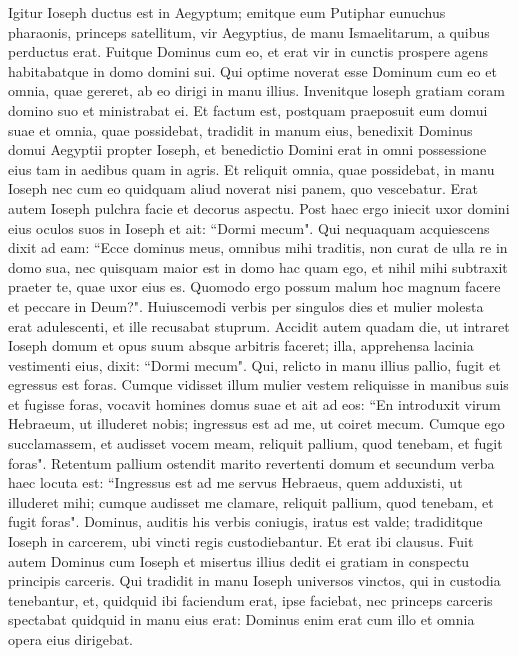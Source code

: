 \begin{biblechapter}  
\verse Igitur Ioseph ductus est in Aegyptum; emitque eum Putiphar eunuchus pharaonis, princeps satellitum, vir Aegyptius, de manu Ismaelitarum, a quibus perductus erat. 
\verse Fuitque Dominus cum eo, et erat vir in cunctis prospere agens habitabatque in domo domini sui. 
\verse Qui optime noverat esse Dominum cum eo et omnia, quae gereret, ab eo dirigi in manu illius. 
\verse Invenitque loseph gratiam coram domino suo et ministrabat ei. Et factum est, postquam praeposuit eum domui suae et omnia, quae possidebat, tradidit in manum eius, 
\verse benedixit Dominus domui Aegyptii propter Ioseph, et benedictio Domini erat in omni possessione eius tam in aedibus quam in agris. 
\verse Et reliquit omnia, quae possidebat, in manu Ioseph nec cum eo quidquam aliud noverat nisi panem, quo vescebatur. Erat autem Ioseph pulchra facie et decorus aspectu. 
\verse Post haec ergo iniecit uxor domini eius oculos suos in Ioseph et ait: “Dormi mecum". 
\verse Qui nequaquam acquiescens dixit ad eam: “Ecce dominus meus, omnibus mihi traditis, non curat de ulla re in domo sua, 
\verse nec quisquam maior est in domo hac quam ego, et nihil mihi subtraxit praeter te, quae uxor eius es. Quomodo ergo possum malum hoc magnum facere et peccare in Deum?".  
\verse Huiuscemodi verbis per singulos dies et mulier molesta erat adulescenti, et ille recusabat stuprum. 
\verse Accidit autem quadam die, ut intraret Ioseph domum et opus suum absque arbitris faceret; 
\verse illa, apprehensa lacinia vestimenti eius, dixit: “Dormi mecum". Qui, relicto in manu illius pallio, fugit et egressus est foras.  
\verse Cumque vidisset illum mulier vestem reliquisse in manibus suis et fugisse foras, 
\verse vocavit homines domus suae et ait ad eos: “En introduxit virum Hebraeum, ut illuderet nobis; ingressus est ad me, ut coiret mecum. Cumque ego succlamassem, 
\verse et audisset vocem meam, reliquit pallium, quod tenebam, et fugit foras". 
\verse Retentum pallium ostendit marito revertenti domum 
\verse et secundum verba haec locuta est: “Ingressus est ad me servus Hebraeus, quem adduxisti, ut illuderet mihi; 
\verse cumque audisset me clamare, reliquit pallium, quod tenebam, et fugit foras". 
\verse Dominus, auditis his verbis coniugis, iratus est valde; 
\verse tradiditque Ioseph in carcerem, ubi vincti regis custodiebantur. Et erat ibi clausus. 
\verse Fuit autem Dominus cum Ioseph et misertus illius dedit ei gratiam in conspectu principis carceris. 
\verse Qui tradidit in manu Ioseph universos vinctos, qui in custodia tenebantur, et, quidquid ibi faciendum erat, ipse faciebat, 
\verse nec princeps carceris spectabat quidquid in manu eius erat: Dominus enim erat cum illo et omnia opera eius dirigebat. 
\end{biblechapter}

